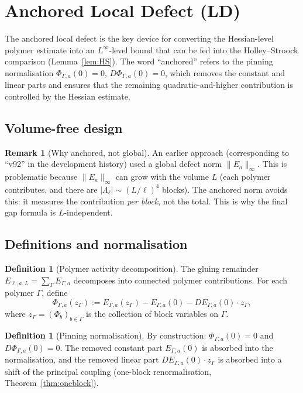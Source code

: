 \documentclass[12pt]{article}
\theoremstyle{plain}
\theoremstyle{definition}
\newtheorem{definition}[theorem]{Definition}
\newtheorem{remark}[theorem]{Remark}
\numberwithin{equation}{section}
\begin{document}
\section{Anchored Local Defect (LD)}\label{sec:LD}

The anchored local defect is the key device for converting the Hessian-level polymer estimate into an $L^\infty$-level bound that can be fed into the Holley--Stroock comparison (Lemma~\ref{lem:HS}).  The word ``anchored'' refers to the pinning normalisation $\Phi_{\Gamma,a}(0)=0$, $D\Phi_{\Gamma,a}(0)=0$, which removes the constant and linear parts and ensures that the remaining quadratic-and-higher contribution is controlled by the Hessian estimate.

\subsection{Volume-free design}

\begin{remark}[Why anchored, not global]
An earlier approach (corresponding to ``v92'' in the development history) used a global defect norm $\|E_a\|_\infty$.  This is problematic because $\|E_a\|_\infty$ can grow with the volume $L$ (each polymer contributes, and there are $|\Lambda_\ell|\sim(L/\ell)^4$ blocks).  The anchored norm avoids this: it measures the contribution \emph{per block}, not the total.  This is why the final gap formula is $L$-independent.
\end{remark}

\subsection{Definitions and normalisation}

\begin{definition}[Polymer activity decomposition]
The gluing remainder $E_{\ell,a,L}=\sum_\Gamma E_{\Gamma,a}$ decomposes into connected polymer contributions.  For each polymer $\Gamma$, define
\begin{equation}
\Phi_{\Gamma,a}(z_\Gamma) := E_{\Gamma,a}(z_\Gamma) - E_{\Gamma,a}(0) - DE_{\Gamma,a}(0)\cdot z_\Gamma,
\end{equation}
where $z_\Gamma=(\Phi_b)_{b\in\Gamma}$ is the collection of block variables on $\Gamma$.
\end{definition}

\begin{definition}[Pinning normalisation]
By construction: $\Phi_{\Gamma,a}(0)=0$ and $D\Phi_{\Gamma,a}(0)=0$.  The removed constant part $E_{\Gamma,a}(0)$ is absorbed into the normalisation, and the removed linear part $DE_{\Gamma,a}(0)\cdot z_\Gamma$ is absorbed into a shift of the principal coupling (one-block renormalisation, Theorem~\ref{thm:oneblock}).
\end{definition}
\end{document}
